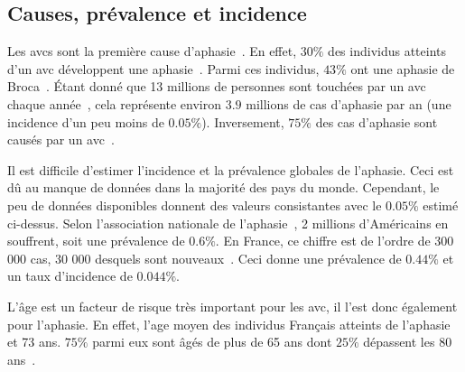 \subsection{Causes, prévalence et incidence}

Les \glspl{avc} sont la première cause d'aphasie~\cite{Hallowell_2017}.
En effet, \(30\%\) des individus atteints d'un \gls{avc} 
développent une aphasie~\cite{Flowers_Skoretz_Silver_Rochon_Fang_Flamand-Roze_Martino_2016}.
Parmi ces individus, \(43\%\) ont une aphasie de Broca~\cite{CNSA_2015}.
Étant donné que 13 millions de personnes sont touchées par un \gls{avc} 
chaque année~\cite{Smaili_Langlois_Pribil_2022},
cela représente environ \(3.9\) millions de cas d'aphasie par an (une incidence d'un peu moins de \(0.05\%\)).
Inversement, \(75\%\) des cas d'aphasie sont causés par un \gls{avc}~\cite{CNSA_2015}.

Il est difficile d'estimer l'incidence et la prévalence globales de l'aphasie.
Ceci est dû au manque de données dans la majorité des pays du monde.
Cependant, le peu de données disponibles donnent des valeurs consistantes avec le \(0.05\%\) estimé ci-dessus.
Selon l'association nationale de l'aphasie~\cite{Home}, 2 millions d'Américains en souffrent, 
soit une prévalence de \(0.6\%\).
En France, ce chiffre est de l'ordre de 300 000 cas, 30 000 desquels sont nouveaux~\cite{CNSA_2015}.
Ceci donne une prévalence de \(0.44\%\) et un taux d'incidence de \(0.044\%\).

L'âge est un facteur de risque très important pour les \gls{avc},
il l'est donc également pour l'aphasie. 
En effet, l'age moyen des individus Français atteints de l'aphasie et 73 ans.
\(75\%\) parmi eux sont âgés de plus de 65 ans dont \(25\%\) dépassent les 80 ans~\cite{CNSA_2015}.







